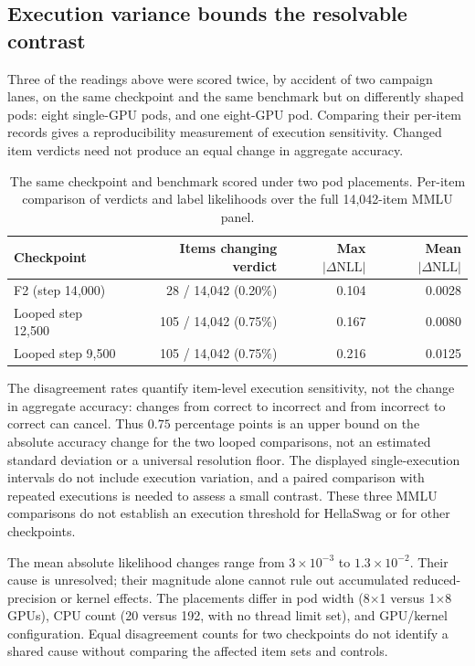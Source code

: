 \subsection{Execution variance bounds the resolvable contrast}
\label{m:variance}

Three of the readings above were scored twice, by accident of two campaign lanes, on the
same checkpoint and the same benchmark but on differently shaped pods: eight single-GPU
pods, and one eight-GPU pod. Comparing their per-item records gives a reproducibility
measurement of execution sensitivity. Changed item verdicts need not produce an equal change in aggregate accuracy.

\begin{table}[t]
\centering\small
\caption{The same checkpoint and benchmark scored under two pod placements. Per-item
comparison of verdicts and label likelihoods over the full 14{,}042-item MMLU panel.}
\begin{tabular}{@{}lrrr@{}}
\toprule
Checkpoint & Items changing verdict & Max $|\Delta \mathrm{NLL}|$ & Mean $|\Delta \mathrm{NLL}|$\\
\midrule
F2 (step 14{,}000) & 28 / 14{,}042 (0.20\%) & 0.104 & 0.0028\\
Looped step 12{,}500 & 105 / 14{,}042 (0.75\%) & 0.167 & 0.0080\\
Looped step 9{,}500 & 105 / 14{,}042 (0.75\%) & 0.216 & 0.0125\\
\bottomrule
\end{tabular}
\label{tab:variance}
\end{table}

The disagreement rates quantify item-level execution sensitivity, not the change in
aggregate accuracy: changes from correct to incorrect and from incorrect to correct can
cancel. Thus $0.75$ percentage points is an upper bound on the absolute accuracy change
for the two looped comparisons, not an estimated standard deviation or a universal
resolution floor. The displayed single-execution intervals do not include execution
variation, and a paired comparison with repeated executions is needed to assess a small
contrast. These three MMLU comparisons do not establish an execution threshold for
HellaSwag or for other checkpoints.

The mean absolute likelihood changes range from $3\times10^{-3}$ to
$1.3\times10^{-2}$. Their cause is unresolved; their magnitude alone cannot rule out
accumulated reduced-precision or kernel effects. The placements differ in pod width
(8$\times$1 versus 1$\times$8 GPUs), CPU count (20 versus 192, with no thread limit
set), and GPU/kernel configuration. Equal disagreement counts for two checkpoints do
not identify a shared cause without comparing the affected item sets and controls.

